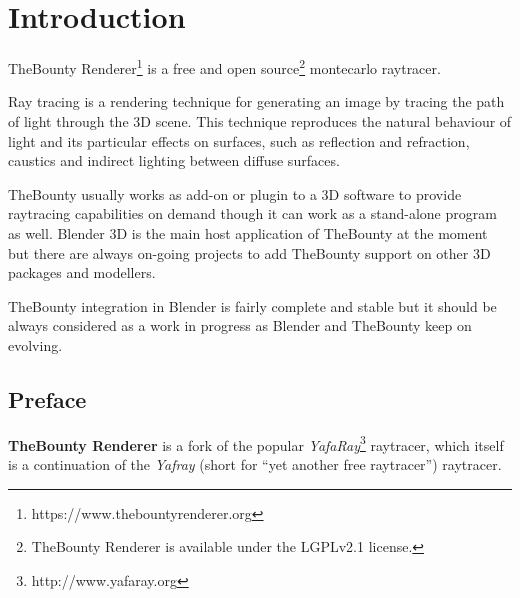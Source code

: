 \chapter*{Introduction}

TheBounty Renderer\footnote{https://www.thebountyrenderer.org} is a free and open source\footnote{TheBounty Renderer is available under the LGPLv2.1 license.} montecarlo raytracer.

\bigskip

Ray tracing is a rendering technique for generating an image by tracing the path of light through the 3D scene. This technique reproduces the natural behaviour of light and its particular effects on surfaces, such as reflection and refraction, caustics and indirect lighting between diffuse surfaces.

TheBounty usually works as add-on or plugin to a 3D software to provide raytracing capabilities on demand though it can work as a stand-alone program as well. Blender 3D is the main host application of TheBounty at the moment but there are always on-going projects to add TheBounty support on other 3D packages and modellers.

TheBounty integration in Blender is fairly complete and stable but it should be always considered as a work in progress as Blender and TheBounty keep on evolving. 

\section*{Preface}

\textbf{TheBounty Renderer} is a fork of the popular \textit{YafaRay}\footnote{http://www.yafaray.org} raytracer, which itself is a continuation of the \textit{Yafray} (short for ``yet another free raytracer'') raytracer.




